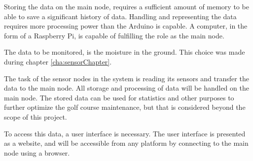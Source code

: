 Storing the data on the main node, requires a sufficient amount of memory to be able to save a significant history of data. Handling and representing the data requires more processing power than the Arduino is capable. A computer, in the form of a Raspberry Pi, is capable of fulfilling the role as the main node. 

The data to be monitored, is the moisture in the ground. This choice was made during chapter \ref{cha:sensorChapter}.

The task of the sensor nodes in the system is reading its sensors and transfer the data to the main node. All storage and processing of data will be handled on the main node.
The stored data can be used for statistics and other purposes to further optimize the golf course maintenance, but that is considered beyond the scope of this project.

To access this data, a user interface is necessary. The user interface is presented as a website, and will be accessible from any platform by connecting to the main node using a browser.